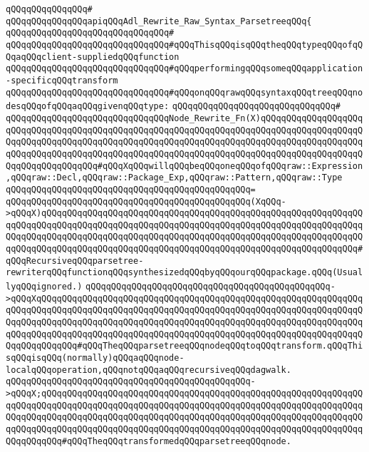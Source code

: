 \verb|qQQqqQQqqQQqqQQq#|\newline
\verb|qQQqqQQqqQQqqQQqapiqQQqAdl_Rewrite_Raw_Syntax_ParsetreeqQQq{|\newline
\verb|qQQqqQQqqQQqqQQqqQQqqQQqqQQqqQQq#|\newline
\newline
\verb|qQQqqQQqqQQqqQQqqQQqqQQqqQQqqQQq#qQQqThisqQQqisqQQqtheqQQqtypeqQQqofqQQqaqQQqclient-suppliedqQQqfunction|\newline
\verb|qQQqqQQqqQQqqQQqqQQqqQQqqQQqqQQq#qQQqperformingqQQqsomeqQQqapplication-specificqQQqtransform|\newline
\verb|qQQqqQQqqQQqqQQqqQQqqQQqqQQqqQQq#qQQqonqQQqrawqQQqsyntaxqQQqtreeqQQqnodesqQQqofqQQqaqQQqgivenqQQqtype:|\newline
\verb|qQQqqQQqqQQqqQQqqQQqqQQqqQQqqQQq#|\newline
\verb|qQQqqQQqqQQqqQQqqQQqqQQqqQQqqQQqNode_Rewrite_Fn(X)qQQqqQQqqQQqqQQqqQQqqQQqqQQqqQQqqQQqqQQqqQQqqQQqqQQqqQQqqQQqqQQqqQQqqQQqqQQqqQQqqQQqqQQqqQQqqQQqqQQqqQQqqQQqqQQqqQQqqQQqqQQqqQQqqQQqqQQqqQQqqQQqqQQqqQQqqQQqqQQqqQQqqQQqqQQqqQQqqQQqqQQqqQQqqQQqqQQqqQQqqQQqqQQqqQQqqQQqqQQqqQQqqQQqqQQqqQQqqQQqqQQqqQQq#qQQqXqQQqwillqQQqbeqQQqoneqQQqofqQQqraw::Expression,qQQqraw::Decl,qQQqraw::Package_Exp,qQQqraw::Pattern,qQQqraw::Type|\newline
\verb|qQQqqQQqqQQqqQQqqQQqqQQqqQQqqQQqqQQqqQQqqQQqqQQq=|\newline
\verb|qQQqqQQqqQQqqQQqqQQqqQQqqQQqqQQqqQQqqQQqqQQqqQQq(XqQQq->qQQqX)qQQqqQQqqQQqqQQqqQQqqQQqqQQqqQQqqQQqqQQqqQQqqQQqqQQqqQQqqQQqqQQqqQQqqQQqqQQqqQQqqQQqqQQqqQQqqQQqqQQqqQQqqQQqqQQqqQQqqQQqqQQqqQQqqQQqqQQqqQQqqQQqqQQqqQQqqQQqqQQqqQQqqQQqqQQqqQQqqQQqqQQqqQQqqQQqqQQqqQQqqQQqqQQqqQQqqQQqqQQqqQQqqQQqqQQqqQQqqQQqqQQqqQQqqQQqqQQqqQQqqQQqqQQqqQQq#qQQqRecursiveqQQqparsetree-rewriterqQQqfunctionqQQqsynthesizedqQQqbyqQQqourqQQqpackage.qQQq(UsuallyqQQqignored.)|\newline
\verb|qQQqqQQqqQQqqQQqqQQqqQQqqQQqqQQqqQQqqQQqqQQqqQQq->qQQqXqQQqqQQqqQQqqQQqqQQqqQQqqQQqqQQqqQQqqQQqqQQqqQQqqQQqqQQqqQQqqQQqqQQqqQQqqQQqqQQqqQQqqQQqqQQqqQQqqQQqqQQqqQQqqQQqqQQqqQQqqQQqqQQqqQQqqQQqqQQqqQQqqQQqqQQqqQQqqQQqqQQqqQQqqQQqqQQqqQQqqQQqqQQqqQQqqQQqqQQqqQQqqQQqqQQqqQQqqQQqqQQqqQQqqQQqqQQqqQQqqQQqqQQqqQQqqQQqqQQqqQQqqQQqqQQqqQQqqQQqqQQqqQQq#qQQqTheqQQqparsetreeqQQqnodeqQQqtoqQQqtransform.qQQqThisqQQqisqQQq(normally)qQQqaqQQqnode-localqQQqoperation,qQQqnotqQQqaqQQqrecursiveqQQqdagwalk.|\newline
\verb|qQQqqQQqqQQqqQQqqQQqqQQqqQQqqQQqqQQqqQQqqQQqqQQq->qQQqX;qQQqqQQqqQQqqQQqqQQqqQQqqQQqqQQqqQQqqQQqqQQqqQQqqQQqqQQqqQQqqQQqqQQqqQQqqQQqqQQqqQQqqQQqqQQqqQQqqQQqqQQqqQQqqQQqqQQqqQQqqQQqqQQqqQQqqQQqqQQqqQQqqQQqqQQqqQQqqQQqqQQqqQQqqQQqqQQqqQQqqQQqqQQqqQQqqQQqqQQqqQQqqQQqqQQqqQQqqQQqqQQqqQQqqQQqqQQqqQQqqQQqqQQqqQQqqQQqqQQqqQQqqQQqqQQqqQQqqQQqqQQq#qQQqTheqQQqtransformedqQQqparsetreeqQQqnode.|\newline
